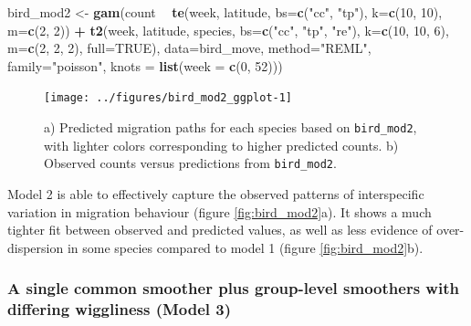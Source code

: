\documentclass[12pt]{article}
\newenvironment{Shaded}{\begin{snugshade}}{\end{snugshade}}
\newcommand{\KeywordTok}[1]{\textcolor[rgb]{0.13,0.29,0.53}{\textbf{#1}}}
\newcommand{\DataTypeTok}[1]{\textcolor[rgb]{0.13,0.29,0.53}{#1}}
\newcommand{\DecValTok}[1]{\textcolor[rgb]{0.00,0.00,0.81}{#1}}
\newcommand{\StringTok}[1]{\textcolor[rgb]{0.31,0.60,0.02}{#1}}
\newcommand{\OtherTok}[1]{\textcolor[rgb]{0.56,0.35,0.01}{#1}}
\newcommand{\OperatorTok}[1]{\textcolor[rgb]{0.81,0.36,0.00}{\textbf{#1}}}
\newcommand{\NormalTok}[1]{#1}
\begin{document}
\begin{Shaded}
\begin{Highlighting}[]
\NormalTok{bird_mod2 <-}\StringTok{ }\KeywordTok{gam}\NormalTok{(count }\OperatorTok{~}\StringTok{ }\KeywordTok{te}\NormalTok{(week, latitude, }\DataTypeTok{bs=}\KeywordTok{c}\NormalTok{(}\StringTok{"cc"}\NormalTok{, }\StringTok{"tp"}\NormalTok{),}
                            \DataTypeTok{k=}\KeywordTok{c}\NormalTok{(}\DecValTok{10}\NormalTok{, }\DecValTok{10}\NormalTok{), }\DataTypeTok{m=}\KeywordTok{c}\NormalTok{(}\DecValTok{2}\NormalTok{, }\DecValTok{2}\NormalTok{)) }\OperatorTok{+}
\StringTok{                   }\KeywordTok{t2}\NormalTok{(week, latitude, species, }\DataTypeTok{bs=}\KeywordTok{c}\NormalTok{(}\StringTok{"cc"}\NormalTok{, }\StringTok{"tp"}\NormalTok{, }\StringTok{"re"}\NormalTok{),}
                      \DataTypeTok{k=}\KeywordTok{c}\NormalTok{(}\DecValTok{10}\NormalTok{, }\DecValTok{10}\NormalTok{, }\DecValTok{6}\NormalTok{), }\DataTypeTok{m=}\KeywordTok{c}\NormalTok{(}\DecValTok{2}\NormalTok{, }\DecValTok{2}\NormalTok{, }\DecValTok{2}\NormalTok{), }\DataTypeTok{full=}\OtherTok{TRUE}\NormalTok{),}
                 \DataTypeTok{data=}\NormalTok{bird_move, }\DataTypeTok{method=}\StringTok{"REML"}\NormalTok{, }\DataTypeTok{family=}\StringTok{"poisson"}\NormalTok{, }
                 \DataTypeTok{knots =} \KeywordTok{list}\NormalTok{(}\DataTypeTok{week =} \KeywordTok{c}\NormalTok{(}\DecValTok{0}\NormalTok{, }\DecValTok{52}\NormalTok{)))}
\end{Highlighting}
\end{Shaded}

\begin{figure}
\texttt{[image: ../figures/bird\_mod2\_ggplot-1]} \caption{\label{fig:bird_mod2}a) Predicted migration paths for each species based on \texttt{bird\_mod2}, with lighter colors corresponding to higher predicted counts. b) Observed counts versus predictions from \texttt{bird\_mod2}.}\label{fig:bird_mod2_ggplot}
\end{figure}

Model 2 is able to effectively capture the observed patterns of
interspecific variation in migration behaviour (figure
\ref{fig:bird_mod2}a). It shows a much tighter fit between observed and
predicted values, as well as less evidence of over-dispersion in some
species compared to model 1 (figure \ref{fig:bird_mod2}b).

\subsubsection{A single common smoother plus group-level smoothers with
differing wiggliness (Model
3)}\label{a-single-common-smoother-plus-group-level-smoothers-with-differing-wiggliness-model-3}
\end{document}

